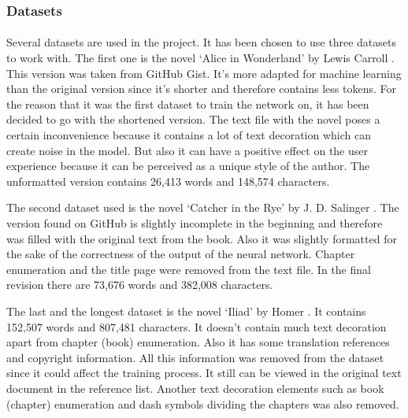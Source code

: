 \documentclass[12pt]{report}
\begin{document}


\subsubsection*{Datasets}
\paragraph{}
Several datasets are used in the project. It has been chosen to use three datasets to work with. The first one is
the novel `Alice in Wonderland' by Lewis Carroll \citep{alice_in_wonderland}. This version was taken from GitHub Gist.
It's more adapted for machine learning than the original version since it's shorter and therefore contains less tokens.
For the reason that it was the first dataset to train the network on, it has been decided to go with the shortened version.
The text file with the novel poses a certain inconvenience because it contains a lot of text decoration which can create
noise in the model. But also it can have a positive effect on the user experience because it can be perceived as a
unique style of the author. The unformatted version contains 26,413 words and 148,574 characters.

The second dataset used is the novel `Catcher in the Rye' by J. D. Salinger \citep{catcher_in_the_rye}. The version found on GitHub is
slightly incomplete in the beginning and therefore was filled with the original text from the book. Also it was slightly
formatted for the sake of the correctness of the output of the neural network. Chapter enumeration and the title page
were removed from the text file. In the final revision there are 73,676 words and 382,008 characters.

The last and the longest dataset is the novel `Iliad' by Homer \citep{the_iliad}. It contains 152,507 words and 807,481 characters.
It doesn't contain much text decoration apart from chapter (book) enumeration. Also it has some translation references and copyright information.
All this information was removed from the dataset since it could affect the training process. It still can be viewed in the original text document 
in the reference list. Another text decoration elements such as book (chapter) enumeration and dash symbols dividing the chapters was also removed.
\end{document}
